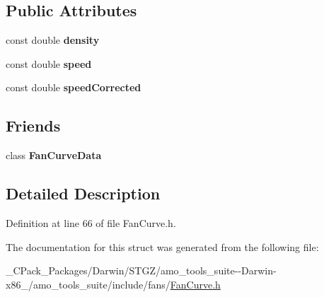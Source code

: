 \subsection*{Public Attributes}
\begin{DoxyCompactItemize}
\item 
\mbox{\label{struct_fan_curve_data_1_1_rated_point_ae85a258074490d9691d6ebac53c38b81}} 
const double {\bfseries density}
\item 
\mbox{\label{struct_fan_curve_data_1_1_rated_point_a48f6364f9e14b8a204fef020f967254e}} 
const double {\bfseries speed}
\item 
\mbox{\label{struct_fan_curve_data_1_1_rated_point_a845b68ddecfbdbf42c9ea6f0df607a03}} 
const double {\bfseries speed\+Corrected}
\end{DoxyCompactItemize}
\subsection*{Friends}
\begin{DoxyCompactItemize}
\item 
\mbox{\label{struct_fan_curve_data_1_1_rated_point_a6c0df668730aa3a6673d279f2bbe7799}} 
class {\bfseries Fan\+Curve\+Data}
\end{DoxyCompactItemize}


\subsection{Detailed Description}


Definition at line 66 of file Fan\+Curve.\+h.



The documentation for this struct was generated from the following file\+:\begin{DoxyCompactItemize}
\item 
\+\_\+\+C\+Pack\+\_\+\+Packages/\+Darwin/\+S\+T\+G\+Z/amo\+\_\+tools\+\_\+suite-\/-\/\+Darwin-\/x86\+\_/amo\+\_\+tools\+\_\+suite/include/fans/\hyperlink{___c_pack___packages_2_darwin_2_s_t_g_z_2amo__tools__suite--_darwin-x86__64_2amo__tools__suite_2include_2fans_2_fan_curve_8h}{Fan\+Curve.\+h}\end{DoxyCompactItemize}
